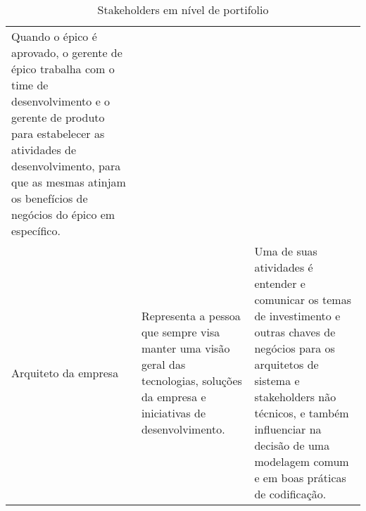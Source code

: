 \begin{table}[!htb]
\begin{tabular}{p{}p{6cm}p{6cm}}
                                                                                              Quando o épico é aprovado, o gerente de
                                                                                              épico trabalha com o time de desenvolvimento
                                                                                              e o gerente de produto para estabelecer as
                                                                                              atividades de desenvolvimento, para que as
                                                                                              mesmas atinjam os benefícios de negócios do
                                                                                              épico em específico.                          \\
        Arquiteto da empresa             & Representa a pessoa que sempre visa manter uma
                                           visão geral das tecnologias, soluções da empresa
                                           e iniciativas de desenvolvimento.                & Uma de suas atividades é entender e comunicar
                                                                                              os temas de investimento e outras chaves de
                                                                                              negócios para os arquitetos de sistema e
                                                                                              stakeholders não técnicos, e também
                                                                                              influenciar na decisão de uma modelagem comum
                                                                                              e em boas práticas de codificação.            \\
    \end{tabular}
    \caption{Stakeholders em nível de portifolio}
  \end{table}

